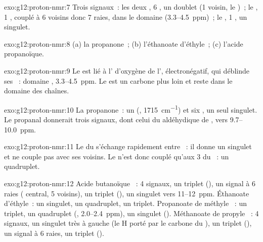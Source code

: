 \begin{solution}{exo:g12:proton-nmr:7}
Trois signaux~: les deux , 6 , un doublet
(1 voisin, le )~; le , 1 , couplé à 6 voisins
donc 7 raies, dans le domaine  (3.3--\qty{4.5}{ppm})~; le
, 1 , un singulet.
\end{solution}

\begin{solution}{exo:g12:proton-nmr:8}
(a) la propanone~; (b) l'éthanoate d'éthyle~; (c) l'acide propanoïque.
\end{solution}

\begin{solution}{exo:g12:proton-nmr:9}
Le  est lié à l' d'oxygène de l', électronégatif, qui
déblinde ses ~: domaine ,
3.3--\qty{4.5}{ppm}. Le  est un carbone plus loin et reste dans
le domaine des chaînes.
\end{solution}

\begin{solution}{exo:g12:proton-nmr:10}
La propanone~: un  (, \qty{1715}{cm^{-1}}) et six , un seul singulet. Le propanal donnerait trois signaux, dont
celui du  aldéhydique de , vers 9.7--\qty{10.0}{ppm}.
\end{solution}

\begin{solution}{exo:g12:proton-nmr:11}
Le  du  s'échange rapidement entre ~: il donne un
singulet et ne couple pas avec ses voisins. Le  n'est donc couplé
qu'aux 3  du ~: un quadruplet.
\end{solution}

\begin{solution}{exo:g12:proton-nmr:12}
Acide butanoïque ~: 4 signaux, un triplet
(), un signal à 6 raies ( central, 5 voisins), un triplet
(), un singulet vers 11--\qty{12}{ppm}. Éthanoate d'éthyle~:
un singulet, un quadruplet, un triplet. Propanoate de méthyle
~: un triplet, un quadruplet (,
2.0--\qty{2.4}{ppm}), un singulet (). Méthanoate de propyle
~: 4 signaux, un singulet très à gauche (le H
porté par le carbone du ), un triplet (), un signal à
6 raies, un triplet ().
\end{solution}

